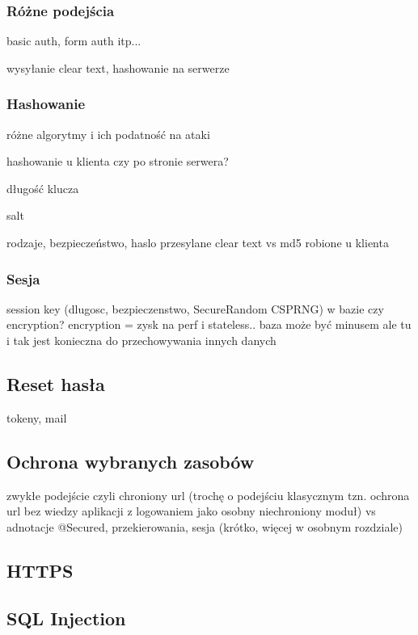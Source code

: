 \documentclass[11pt]{aghdpl}
\begin{document}
\subsubsection{Różne podejścia}

basic auth, form auth itp...

wysyłanie clear text, hashowanie na serwerze

\subsubsection{Hashowanie}

różne algorytmy i ich podatność na ataki

hashowanie u klienta czy po stronie serwera?

długość klucza

salt

rodzaje, bezpieczeństwo, haslo przesylane clear text vs md5 robione u klienta

\subsubsection{Sesja}

session key (dlugosc, bezpieczenstwo, SecureRandom CSPRNG) w bazie czy encryption? encryption = zysk na perf i stateless.. baza może być minusem ale tu i tak jest konieczna do przechowywania innych danych

\subsection{Reset hasła}

tokeny, mail

\subsection{Ochrona wybranych zasobów}

zwykłe podejście czyli chroniony url (trochę o podejściu klasycznym tzn. ochrona url bez wiedzy aplikacji z logowaniem jako osobny niechroniony moduł) vs adnotacje
@Secured, przekierowania, sesja (krótko, więcej w osobnym rozdziale)

\subsection{HTTPS}

\subsection{SQL Injection}
\end{document}
